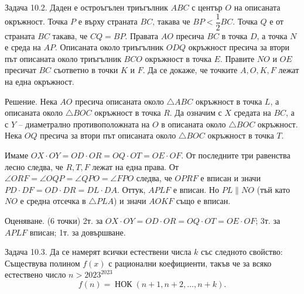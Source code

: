 Задача 10.2. Даден е остроъгълен триъгълник $ABC$ с център $O$ на описаната окръжност. Точка $P$ е върху страната $BC$, такава че $BP<\dfrac12BC$. Точка $Q$ е от страната $BC$ такава, че $CQ=BP$. Правата $AO$ пресича $BC$ в точка $D$, а точка $N$ е среда на $AP$. Описаната около триъгълник $ODQ$ окръжност пресича за втори път описаната около триъгълник $BCO$ окръжност в точка $E$. Правите $NO$ и $OE$ пресичат $BC$ съответно в точки $K$ и $F$. Да се докаже, че точките $A,O,K,F$ лежат на една окръжност.

Решение. Нека $AO$ пресича описаната около $\triangle ABC$ окръжност в точка $L$, а описаната около $\triangle BOC$ окръжност в точка $R$. Да означим с $X$ средата на $BC$, а с $Y$ – диаметрално противоположната на $O$ в описаната около $\triangle BOC$ окръжност. Нека $OQ$ пресича за втори път описаната около $\triangle BOC$ окръжност в точка $T$.

Имаме $OX\cdot OY=OD\cdot OR=OQ\cdot OT=OE\cdot OF$. От последните три равенства лесно следва, че $R,T,F$ лежат на една права. От $\angle ORF=\angle OQP=\angle QPO=\angle FPO$ следва, че $OPRF$ е вписан и значи $PD\cdot DF=OD\cdot DR=DL\cdot DA$. Оттук, $APLF$ е вписан. Но $PL\parallel NO$ (тъй като $NO$ е средна отсечка в $\triangle PLA$) и значи $AOKF$ също е вписан.

Оценяване. (6 точки) 2т. за $OX\cdot OY=OD\cdot OR=OQ\cdot OT=OE\cdot OF$; 3т. за $APLF$ вписан; 1т. за довършване.

Задача 10.3. Да се намерят всички естествени числа $k$ със следното свойство: Съществува полином $f(x)$ с рационални коефициенти, такъв че за всяко естествено число $n>2023^{2023}$
$$
f(n)=\operatorname{НОК}(n+1,n+2,\ldots,n+k).
$$

